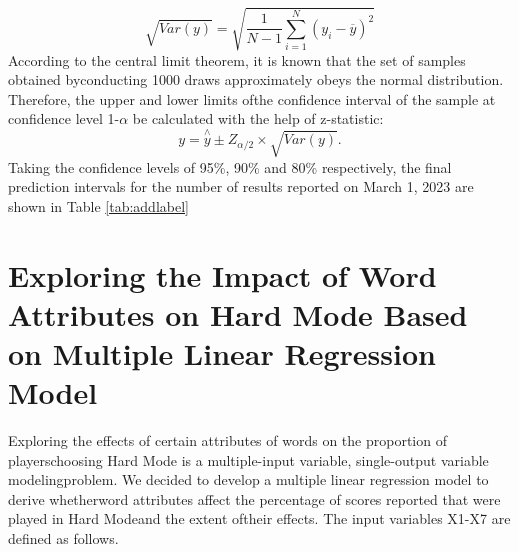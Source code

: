 \documentclass[12pt]{ctexart}
\begin{document}
\begin{equation*}
	\sqrt{Var(y)}=\sqrt{\frac{1}{N-1}\sum_{i=1}^{N}(y_i-\overline{y})^2}
\end{equation*}
According to the central limit theorem, it is known that the set of samples obtained byconducting 1000 draws approximately obeys the normal distribution. Therefore, the upper and lower limits ofthe confidence interval of the sample at confidence level 1-$\alpha$ be calculated with the help of z-statistic:
\begin{equation}
	y=\stackrel{\wedge}{y}\pm Z_{\alpha/2}\times\sqrt{Var(y)}.\label{eq:2}
\end{equation}
Taking the confidence levels of 95\%, 90\% and 80\% respectively, the final prediction intervals for the number of results reported on March 1, 2023 are shown in Table \ref{tab:addlabel}

\begin{table}[htbp]
    \centering  %
    \caption{Confidence Intervals}
    \label{tab:addlabel}
\end{table}

\section{Exploring the Impact of Word Attributes on Hard Mode Based on Multiple Linear Regression Model}

Exploring the effects of certain attributes of words on the proportion of playerschoosing Hard Mode is a multiple-input variable, single-output variable modelingproblem. We decided to develop a multiple linear regression model to derive whetherword attributes affect the percentage of scores reported that were played in Hard Modeand the extent oftheir effects. The input variables X1-X7 are defined as follows.
\end{document}
